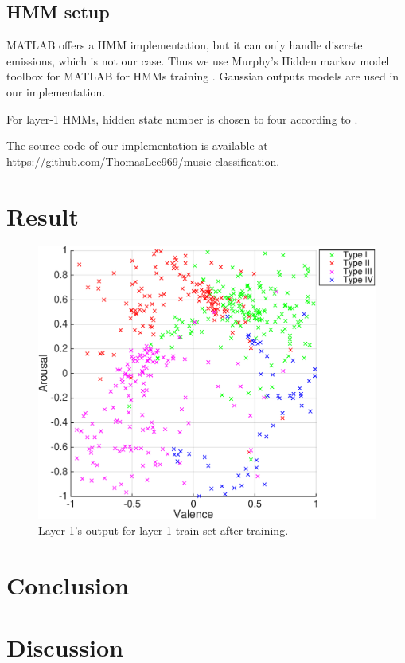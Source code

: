 \documentclass{IEEEtran}
\begin{document}
  \subsection{HMM setup}

  MATLAB offers a HMM implementation, but it can only handle discrete
  emissions, which is not our case. Thus we use Murphy's Hidden markov model
  toolbox for MATLAB for HMMs training \cite{murphy1998hidden}. Gaussian
  outputs models are used in our implementation.

  For layer-1 HMMs, hidden state number is chosen to four according to
  \cite{chai2001folk}.

  The source code of our implementation is available at
  \url{https://github.com/ThomasLee969/music-classification}.


  \section{Result}
  \label{sec:Result}

  \begin{figure}[htbp]
    \centering
    \includegraphics[width=\columnwidth]{trainset.pdf}
    \caption{Layer-1's output for layer-1 train set after training.}
    \label{fig:trainset}
  \end{figure}


  \section{Conclusion}
  \label{sec:Conclusion}

  \section{Discussion}
  \label{sec:Discussion}


  
  
\end{document}
